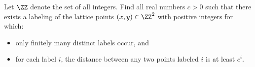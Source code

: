 Let $\ZZ$ denote the set of all integers. Find all real numbers $c > 0$ such that there exists a labeling of the lattice points $ ( x, y ) \in \ZZ^2$ with positive integers for which: 
\begin{itemize}
	\item only finitely many distinct labels occur, and
	\item for each label $i$, the distance between any two points labeled $i$ is at least $c^i$.
\end{itemize}
